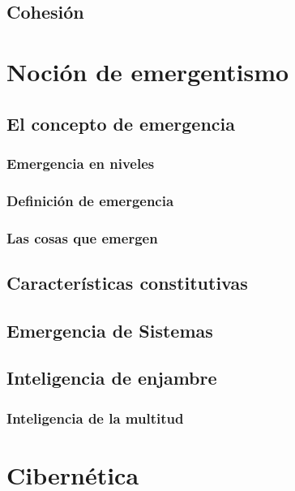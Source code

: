 \subsection{Cohesión}

\section{Noción de  emergentismo}
\subsection{El concepto de emergencia}
\subsubsection{Emergencia en niveles}
\subsubsection{Definición de emergencia}
\subsubsection{Las cosas que emergen}

\subsection{Características constitutivas}
\subsection{Emergencia de Sistemas}
\subsection{Inteligencia de enjambre}
\subsubsection{Inteligencia de la multitud}

\section{Cibernética}
